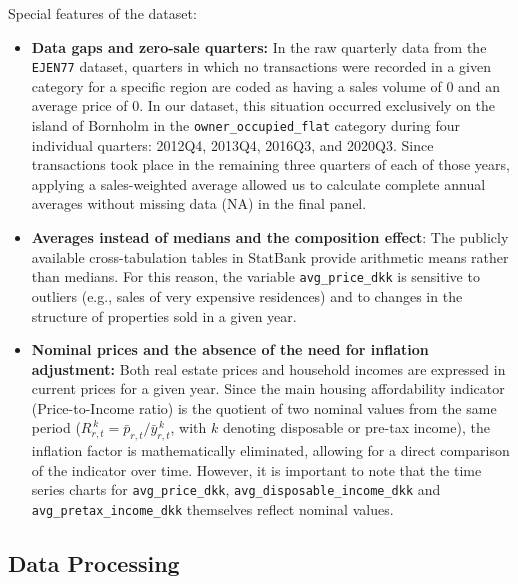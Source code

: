 Special features of the dataset:
\begin{itemize}
  \item \textbf{Data gaps and zero-sale quarters:} In the raw quarterly data from the \texttt{EJEN77} dataset, quarters in which no transactions were recorded in a given category for a specific region are coded as having a sales volume of 0 and an average price of 0. In our dataset, this situation occurred exclusively on the island of Bornholm in the \texttt{owner\_occupied\_flat} category during four individual quarters: 2012Q4, 2013Q4, 2016Q3, and 2020Q3. Since transactions took place in the remaining three quarters of each of those years, applying a sales-weighted average allowed us to calculate complete annual averages without missing data (NA) in the final panel.
  \item \textbf{Averages instead of medians and the composition effect}: The publicly available cross-tabulation tables in StatBank provide arithmetic means rather than medians. For this reason, the variable \texttt{avg\_price\_dkk} is sensitive to outliers (e.g., sales of very expensive residences) and to changes in the structure of properties sold in a given year.
  \item \textbf{Nominal prices and the absence of the need for inflation adjustment:} Both real estate prices and household incomes are expressed in current prices for a given year. Since the main housing affordability indicator (Price-to-Income ratio) is the quotient of two nominal values from the same period ($R^{\,k}_{r,t} = \bar{p}_{r,t} / \bar{y}^{\,k}_{r,t}$, with $k$ denoting disposable or pre-tax income), the inflation factor is mathematically eliminated, allowing for a direct comparison of the indicator over time. However, it is important to note that the time series charts for \texttt{avg\_price\_dkk}, \texttt{avg\_disposable\_income\_dkk} and \texttt{avg\_pretax\_income\_dkk} themselves reflect nominal values.
\end{itemize}

\subsection{Data Processing}

